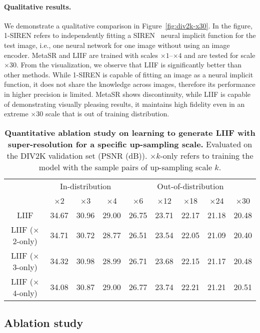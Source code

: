 \documentclass[final]{cvpr}
\begin{document}
\vspace{-1em}
\paragraph{Qualitative results.} We demonstrate a qualitative comparison in Figure~\ref{fig:div2k-x30}. In the figure, 1-SIREN refers to independently fitting a SIREN~\cite{sitzmann2020implicit} neural implicit function for the test image, i.e., one neural network for one image without using an image encoder. MetaSR and LIIF are trained with scales $\times1$--$\times4$ and are tested for scale $\times30$. From the visualization, we observe that LIIF is significantly better than other methods. While 1-SIREN is capable of fitting an image as a neural implicit function, it does not share the knowledge across images, therefore its performance in higher precision is limited. MetaSR shows discontinuity, while LIIF is capable of demonstrating visually pleasing results, it maintains high fidelity even in an extreme $\times30$ scale that is out of training distribution.

\begin{table*}[]
    \centering
    \begin{tabular}{c|ccc|ccccc}
        & \multicolumn{3}{c|}{In-distribution} & \multicolumn{5}{c}{Out-of-distribution} \\
        & $\times$2 & $\times$3 & $\times$4 & $\times$6 & $\times$12 & $\times$18 & $\times$24 & $\times$30 \\
        \hline
        LIIF & 34.67 & 30.96 & 29.00 & 26.75 & 23.71 & 22.17 & 21.18 & 20.48 \\
        LIIF ($\times$2-only) & 34.71 & 30.72 & 28.77 & 26.51 & 23.54 & 22.05 & 21.09 & 20.40 \\
        LIIF ($\times$3-only) & 34.32 & 30.98 & 28.99 & 26.71 & 23.68 & 22.15 & 21.17 & 20.48 \\
        LIIF ($\times$4-only) & 34.08 & 30.87 & 29.00 & 26.77 & 23.74 & 22.21 & 21.21 & 20.51
    \end{tabular}
    \caption{\textbf{Quantitative ablation study on learning to generate LIIF with super-resolution for a specific up-sampling scale.} Evaluated on the DIV2K validation set (PSNR (dB)). $\times k$-only refers to training the model with the sample pairs of up-sampling scale $k$.}
    \label{tab:div2k-abl-single-scale}
\end{table*}

\subsection{Ablation study}
\end{document}
